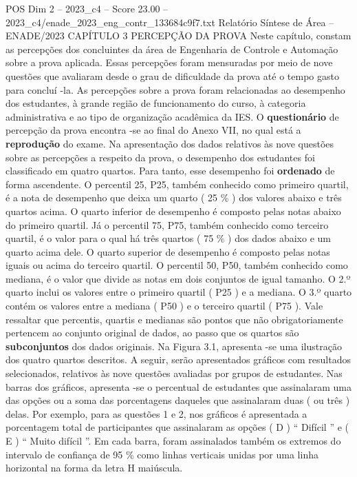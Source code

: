 \begin{textsample}{POS Dim 2 – 2023\_c4 – Score 23.00 – 2023\_c4/enade\_2023\_eng\_contr\_133684c9f7.txt}  \label{ex:f2_pos_020}
Relatório Síntese de Área – ENADE/2023 CAPÍTULO 3 PERCEPÇÃO DA PROVA Neste capítulo, constam as percepções dos concluintes da área de Engenharia de Controle e Automação sobre a prova aplicada.
Essas percepções foram mensuradas por meio de nove questões que avaliaram desde o grau de dificuldade da prova até o tempo gasto para concluí -la.
As percepções sobre a prova foram relacionadas ao desempenho dos estudantes, à grande região de funcionamento do curso, à categoria administrativa e ao tipo de organização acadêmica da IES.
O \textbf{questionário} de percepção da prova encontra -se ao final do Anexo VII, no qual está a \textbf{reprodução} do exame.
Na apresentação dos dados relativos às nove questões sobre as percepções a respeito da prova, o desempenho dos estudantes foi classificado em quatro quartos.
Para tanto, esse desempenho foi \textbf{ordenado} de forma ascendente.
O percentil 25, P25, também conhecido como primeiro quartil, é a nota de desempenho que deixa um quarto ( 25 \% ) dos valores abaixo e três quartos acima.
O quarto inferior de desempenho é composto pelas notas abaixo do primeiro quartil.
Já o percentil 75, P75, também conhecido como terceiro quartil, é o valor para o qual há três quartos ( 75 \% ) dos dados abaixo e um quarto acima dele.
O quarto superior de desempenho é composto pelas notas iguais ou acima do terceiro quartil.
O percentil 50, P50, também conhecido como mediana, é o valor que divide as notas em dois conjuntos de igual tamanho.
O 2.º quarto inclui os valores entre o primeiro quartil ( P25 ) e a mediana.
O 3.º quarto contém os valores entre a mediana ( P50 ) e o terceiro quartil ( P75 ).
Vale ressaltar que percentis, quartis e medianas são pontos que não obrigatoriamente pertencem ao conjunto original de dados, ao passo que os quartos são \textbf{subconjuntos} dos dados originais.
Na Figura 3.1, apresenta -se uma ilustração dos quatro quartos descritos.
A seguir, serão apresentados gráficos com resultados selecionados, relativos às nove questões avaliadas por grupos de estudantes.
Nas barras dos gráficos, apresenta -se o percentual de estudantes que assinalaram uma das opções ou a soma das porcentagens daqueles que assinalaram duas ( ou três ) delas.
Por exemplo, para as questões 1 e 2, nos gráficos é apresentada a porcentagem total de participantes que assinalaram as opções ( D ) “ Difícil ” e ( E ) “ Muito difícil ”.
Em cada barra, foram assinalados também os extremos do intervalo de confiança de 95 \% como linhas verticais unidas por uma linha horizontal na forma da letra H maiúscula.

\end{textsample}
